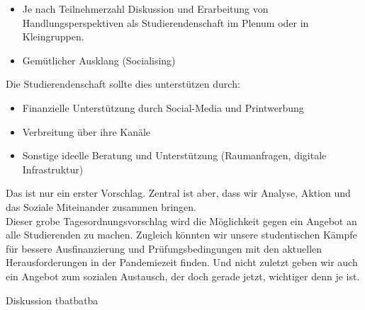 {\begin{itemize}
                Wissenschaft (zum Beispiel Sozialforschung) oder Schulen und Kindergärten.
            \item Je nach Teilnehmerzahl Diskussion und Erarbeitung von Handlungsperspektiven als
                Studierendenschaft im Plenum oder in Kleingruppen.
            \item Gemütlicher Ausklang (Socialising)
        \end{itemize}
        Die Studierendenschaft sollte dies unterstützen durch:\\
        \begin{itemize}
            \item Finanzielle Unterstützung durch Social-Media und Printwerbung
            \item Verbreitung über ihre Kanäle
            \item Sonstige ideelle Beratung und Unterstützung (Raumanfragen, digitale Infrastruktur)
        \end{itemize}
        Das ist nur ein erster Vorschlag. Zentral ist aber, dass wir Analyse, Aktion und das Soziale
        Miteinander zusammen bringen.\\
        Dieser grobe Tagesordnungsvorschlag wird die Möglichkeit gegen ein Angebot an alle Studierenden
        zu machen. Zugleich könnten wir unsere studentischen Kämpfe für bessere Ausfinanzierung und
        Prüfungsbedingungen mit den aktuellen Herausforderungen in der Pandemiezeit finden. Und nicht
        zuletzt geben wir auch ein Angebot zum sozialen Austausch, der doch gerade jetzt, wichtiger denn je ist.
    }{
        Diskussion
    }{tba}{tba}{tba}
